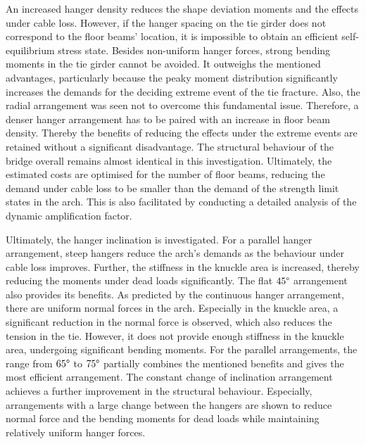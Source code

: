An increased hanger density reduces the shape deviation moments and the effects under cable loss. However, if the hanger spacing on the tie girder does not correspond to the floor beams' location, it is impossible to obtain an efficient self-equilibrium stress state. Besides non-uniform hanger forces, strong bending moments in the tie girder cannot be avoided. It outweighs the mentioned advantages, particularly because the peaky moment distribution significantly increases the demands for the deciding extreme event of the tie fracture. Also, the radial arrangement was seen not to overcome this fundamental issue. Therefore, a denser hanger arrangement has to be paired with an increase in floor beam density. Thereby the benefits of reducing the effects under the extreme events are retained without a significant disadvantage. The structural behaviour of the bridge overall remains almost identical in this investigation. Ultimately, the estimated costs are optimised for the number of floor beams, reducing the demand under cable loss to be smaller than the demand of the strength limit states in the arch. This is also facilitated by conducting a detailed analysis of the dynamic amplification factor. \medskip

Ultimately, the hanger inclination is investigated. For a parallel hanger arrangement, steep hangers reduce the arch's demands as the behaviour under cable loss improves. Further, the stiffness in the knuckle area is increased, thereby reducing the moments under dead loads significantly. The flat $45\degree$ arrangement also provides its benefits. As predicted by the continuous hanger arrangement, there are uniform normal forces in the arch. Especially in the knuckle area, a significant reduction in the normal force is observed, which also reduces the tension in the tie. However, it does not provide enough stiffness in the knuckle area, undergoing significant bending moments. For the parallel arrangements, the range from $65\degree$ to $75\degree$ partially combines the mentioned benefits and gives the most efficient arrangement. The constant change of inclination arrangement achieves a further improvement in the structural behaviour. Especially, arrangements with a large change between the hangers are shown to reduce normal force and the bending moments for dead loads while maintaining relatively uniform hanger forces.
